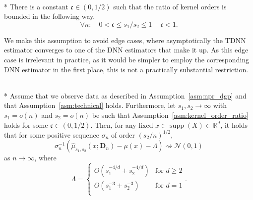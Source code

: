 \begin{boxD}
	\begin{asm}\label{asm:kernel_order_ratio}\mbox{}\\*
		There is a constant $\mathfrak{c} \in (0,1/2)$ such that the ratio of kernel orders is bounded in the following way.
		\begin{equation}
			\forall n: \quad 0 < \mathfrak{c} \leq s_1 / s_2 \leq 1 - \mathfrak{c} < 1.
		\end{equation}
	\end{asm}
\end{boxD}
We make this assumption to avoid edge cases, where asymptotically the TDNN estimator converges to one of the DNN estimators that make it up.
As this edge case is irrelevant in practice, as it would be simpler to employ the corresponding DNN estimator in the first place, this is not a practically substantial restriction.
\begin{boxD}
	\begin{thm}\label{thm:dem3}\mbox{}\\*
		Assume that we observe data as described in Assumption~\ref{asm:npr_dgp} and that Assumption~\ref{asm:technical} holds.
		Furthermore, let $s_1, s_2 \rightarrow \infty$ with $s_1 = o(n)$ and $s_2 = o(n)$ be such that Assumption~\ref{asm:kernel_order_ratio} holds for some $\mathfrak{c} \in (0, 1/2)$.
		Then, for any fixed $x \in \operatorname{supp}(X) \subset \mathbb{R}^d$, it holds that for some positive sequence $\sigma_n$ of order $(s_2/n)^{1/2}$,
		\begin{equation}
			\sigma_n^{-1} \left(\hat{\mu}_{s_1, s_2}\left(x; \mathbf{D}_n\right) - \mu(x) - \Lambda\right) \rightsquigarrow \mathcal{N}(0,1)
		\end{equation}
		as $n \rightarrow \infty$, where
		\begin{equation*}
			\Lambda = \begin{cases}
				O\left(s_1^{-4/d} + s_2^{-4/d}\right) & \text{for } d \geq 2 \\
				O\left(s_1^{-3} + s_2^{-3}\right)     & \text{for } d = 1    \\
			\end{cases} .
		\end{equation*}
	\end{thm}
\end{boxD}

